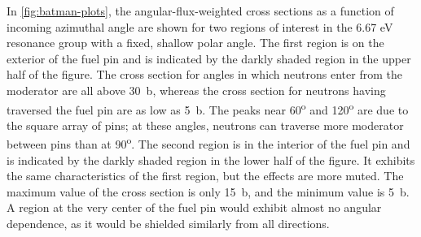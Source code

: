 In \autoref{fig:batman-plots}, the angular-flux-weighted cross sections as a function of incoming azimuthal angle are shown for two regions of interest in the 6.67 eV resonance group with a fixed, shallow polar angle.  The first region is on the exterior of the fuel pin and is indicated by the darkly shaded region in the upper half of the figure.  The cross section for angles in which neutrons enter from the moderator are all above 30~b, whereas the cross section for neutrons having traversed the fuel pin are as low as 5~b.  The peaks near 60\textsuperscript{o} and 120\textsuperscript{o} are due to the square array of pins; at these angles, neutrons can traverse more moderator between pins than at 90\textsuperscript{o}.  The second region is in the interior of the fuel pin and is indicated by the darkly shaded region in the lower half of the figure.  It exhibits the same characteristics of the first region, but the effects are more muted.  The maximum value of the cross section is only 15~b, and the minimum value is 5~b.  A region at the very center of the fuel pin would exhibit almost no angular dependence, as it would be shielded similarly from all directions.

